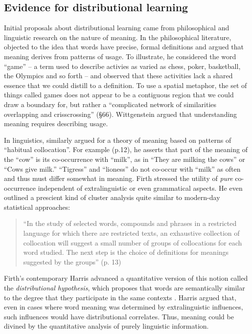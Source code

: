 \documentclass[man,floatsintext]{apa6}
\begin{document}
\subsection{Evidence for distributional learning}

Initial proposals about distributional learning came from philosophical and linguistic research on the nature of meaning. In the philosophical literature, \citet{wittgenstein1953} objected to the idea that words have precise, formal definitions and argued that meaning derives from patterns of usage. To illustrate, he considered the word ``game'' -- a term used to describe activies as varied as chess, poker, basketball, the Olympics and so forth -- and observed that these activities lack a shared essence that we could distill to a definition. To use a spatial metaphor, the set of things called games does not appear to be a contiguous region that we could draw a boundary for, but rather a ``complicated network of similarities overlapping and crisscrossing'' (\S 66). Wittgenstein argued that understanding meaning requires describing usage.

In linguistics, \citet{firth1957} similarly argued for a theory of meaning based on patterns of ``habitual collocation''. For example (p.12), he asserts that part of the meaning of the ``cow'' is its co-occurrence with  ``milk'', as in ``They are milking the cows'' or ``Cows give milk.'' ``Tigress'' and ``lioness'' do not co-occur with ``milk'' as often and thus must differ somewhat in meaning. Firth stressed the utility of \emph{pure} co-occurrence independent of extralinguistic or even grammatical aspects. He even outlined a prescient kind of cluster analysis quite similar to modern-day statistical approaches:

\begin{quote}
``In the study of selected words, compounds and phrases in a restricted language for which there are restricted texts, an exhaustive collection of collocation will suggest a small number of groups of collocations for each word studied. The next step is the choice of definitions for meanings suggested by the groups'' (p. 13)
\end{quote}
Firth's contemporary Harris advanced a quantitative version of this notion called the \emph{distributional hypothesis}, which proposes that words are semantically similar to the degree that they participate in the same contexts \citep{harris1951}. Harris argued that, even in cases where word meaning was determined by extralinguistic influences, such influences would have distributional correlates. Thus, meaning could be divined by the quantitative analysis of purely linguistic information.
\end{document}
